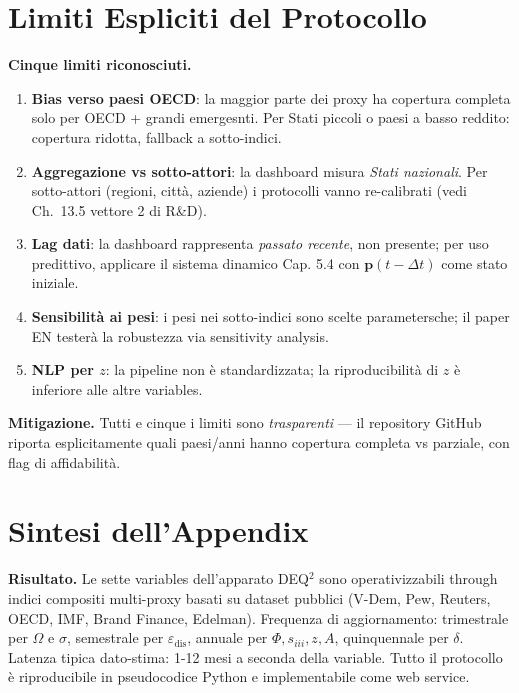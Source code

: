 \section{Limiti Espliciti del
Protocollo}\label{limiti-espliciti-del-protocollo}

\Conj{} \textbf{Cinque limiti riconosciuti.}

\begin{enumerate}
\def\labelenumi{\arabic{enumi}.}
\tightlist
\item
  \textbf{Bias verso paesi OECD}: la maggior parte dei proxy ha
  copertura completa solo per OECD + grandi emergesnti. Per Stati piccoli
  o paesi a basso reddito: copertura ridotta, fallback a sotto-indici.
\item
  \textbf{Aggregazione vs sotto-attori}: la dashboard misura \emph{Stati
  nazionali}. Per sotto-attori (regioni, città, aziende) i protocolli
  vanno re-calibrati (vedi Ch.~13.5 vettore 2 di R\&D).
\item
  \textbf{Lag dati}: la dashboard rappresenta \emph{passato recente},
  non presente; per uso predittivo, applicare il sistema dinamico Cap.
  5.4 con \(\boldsymbol{p}(t-\Delta t)\) come stato iniziale.
\item
  \textbf{Sensibilità ai pesi}: i pesi nei sotto-indici sono scelte
  parametersche; il paper EN testerà la robustezza via sensitivity
  analysis.
\item
  \textbf{NLP per \(z\)}: la pipeline non è standardizzata; la
  riproducibilità di \(z\) è inferiore alle altre variables.
\end{enumerate}

\Proved{} \textbf{Mitigazione.} Tutti e cinque i limiti sono
\emph{trasparenti} --- il repository GitHub riporta esplicitamente quali
paesi/anni hanno copertura completa vs parziale, con flag di
affidabilità.



\section{Sintesi dell'Appendix}\label{sintesi-dellappendix}

\Proved{} \textbf{Risultato.} Le sette variables dell'apparato DEQ$^2$ sono
operativizzabili through indici compositi multi-proxy basati su dataset
pubblici (V-Dem, Pew, Reuters, OECD, IMF, Brand Finance, Edelman).
Frequenza di aggiornamento: trimestrale per \(\Omega\) e \(\sigma\),
semestrale per \(\varepsilon_{\text{dis}}\), annuale per
\(\Phi, s_{iii}, z, A\), quinquennale per \(\delta\). Latenza tipica
dato-stima: 1-12 mesi a seconda della variable. Tutto il protocollo è
riproducibile in pseudocodice Python e implementabile come web service.

